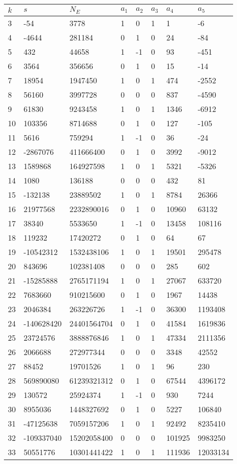 \documentclass{amsart}
\begin{document}
\begin{longtable}{|l|l|l|lllll|}
\hline
$k$ & $s$ & $N_E$ & $a_1$ & $a_2$ & $a_3$ & $a_4$ & $a_5$\\
\hline
3&-54&3778&1&0&1&1&-6\\
4&-4644&281184&0&1&0&24&-84\\
5&432&44658&1&-1&0&93&-451\\
6&3564&356656&0&1&0&15&-14\\
7&18954&1947450&1&0&1&474&-2552\\
8&56160&3997728&0&0&0&837&-4590\\
9&61830&9243458&1&0&1&1346&-6912\\
10&103356&8714688&0&1&0&127&-105\\
11&5616&759294&1&-1&0&36&-24\\
12&-2867076&411666400&0&1&0&3992&-9012\\
13&1589868&164927598&1&0&1&5321&-5326\\
14&1080&136188&0&0&0&432&81\\
15&-132138&23889502&1&0&1&8784&26366\\
16&21977568&2232890016&0&1&0&10960&63132\\
17&38340&5533650&1&-1&0&13458&108116\\
18&119232&17420272&0&1&0&64&67\\
19&-10542312&1532438106&1&0&1&19501&295478\\
20&843696&102381408&0&0&0&285&602\\
21&-15285888&2765171194&1&0&1&27067&633720\\
22&7683660&910215600&0&1&0&1967&14438\\
23&2046384&263226726&1&-1&0&36300&1193408\\
24&-140628420&24401564704&0&1&0&41584&1619836\\
25&23724576&3888876846&1&0&1&47334&2111356\\
26&2066688&272977344&0&0&0&3348&42552\\
27&88452&19701526&1&0&1&96&230\\
28&569890080&61239321312&0&1&0&67544&4396172\\
29&130572&25924374&1&-1&0&930&7244\\
30&8955036&1448327692&0&1&0&5227&106840\\
31&-47125638&7059157206&1&0&1&92492&8235410\\
32&-109337040&15202058400&0&0&0&101925&9983250\\
33&50551776&10301441422&1&0&1&111936&12033134\\

\end{longtable}
\end{document}
